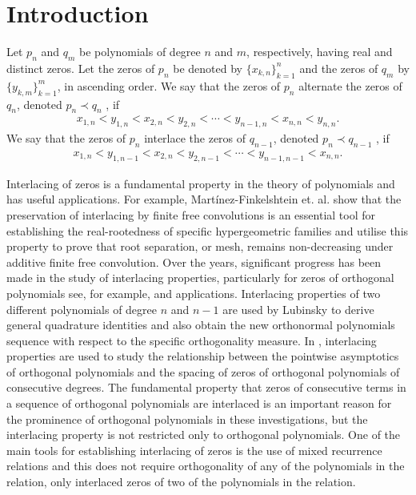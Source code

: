 \documentclass[final,3p,times,12pt]{elsarticle}
\numberwithin{equation}{section}  %
\begin{document}
\section{Introduction }
Let $p_n$ and $q_m$ be polynomials of degree $n$ and $m$, respectively, having real and distinct zeros. Let the zeros of $p_n$ be denoted by $\{x_{k,n}\}_{k=1}^n$ and the zeros of $q_m$ by $\{y_{k,m}\}_{k=1}^m$, in ascending order. We say that the zeros of $p_n$ alternate the zeros of $q_n$, denoted $p_n \prec q_n$ \cite{Liu-Wang-Unified}, if
\begin{align}
	x_{1,n} < y_{1,n} < x_{2,n} <y_{2,n}< \cdots < y_{n-1,n} < x_{n,n} < y_{n,n}.
\end{align}
We say that the zeros of $p_n$ interlace the zeros of $q_{n-1}$, denoted $p_n \prec q_{n-1}$ \cite{Liu-Wang-Unified}, if
\begin{align}
	x_{1,n} < y_{1,n-1} < x_{2,n} < y_{2,n-1} < \cdots < y_{n-1,n-1} < x_{n,n}.
\end{align}

Interlacing of zeros is a fundamental property in the theory of polynomials \cite{Fisk-2008notes, Obrechkoff-2003book,Rahman-Schmeisser-Book} and has useful applications. For example, Martínez-Finkelshtein et. al. \cite{Andrei-Rafael-Perales-Finitefree-convolution-IMRN-2024} show that the preservation of interlacing by finite free convolutions is an essential tool for establishing the real-rootedness of specific hypergeometric families and utilise this property to prove that root separation, or mesh, remains non-decreasing under additive finite free convolution.  Over the years, significant progress has been made in the study of interlacing properties, particularly for zeros of orthogonal polynomials see, for example, \cite{Brezinski-2004, Dimitrov-First-Paper-Interlacing-Notation, Dimitrov-Ismail-Rafaeli-JAT-2013,Driver-Jordaan-NumerMath-2007, Driver-Jordaan-JAT-2012,  Driver-Jordaan-Mbuyi-NumericalAlg-2008, Joulak-ANM-2005} and applications. Interlacing properties of two different polynomials of degree $n$ and $n-1$ are used by Lubinsky \cite{Lubinsky-Interlacing-and-op-ProcAMS-2016} to derive general quadrature identities and also obtain the new orthonormal polynomials sequence with respect to the specific orthogonality measure. In \cite{Levin-Lubinsky-AsymptoticOP-and-Interlacing-JAT-2022}, interlacing properties are used to study the relationship between the pointwise asymptotics of orthogonal polynomials and the spacing of zeros of orthogonal polynomials of consecutive degrees. The fundamental property that zeros of consecutive terms in a sequence of orthogonal polynomials are interlaced is an important reason for the prominence of orthogonal polynomials in these investigations, but the interlacing property is not restricted only to orthogonal polynomials. One of the main tools for establishing interlacing of zeros is the use of mixed recurrence relations and this does not require orthogonality of any of the polynomials in the relation, only interlaced zeros of two of the polynomials in the relation.
\end{document}
